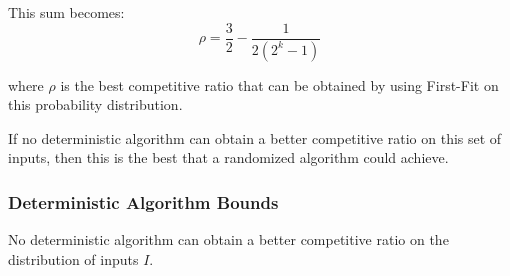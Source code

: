 This sum becomes:
\begin{equation*}
\rho = \frac{3}{2} - \frac{1}{2(2^k-1)}
\end{equation*}

where $\rho$ is the best competitive ratio that can be obtained by using First-Fit on this probability distribution. 

If no deterministic algorithm can obtain a better competitive ratio on this set of inputs, then this is the best that a randomized algorithm could achieve.
\subsubsection{Deterministic Algorithm Bounds}
\begin{theorem}
	No deterministic algorithm can obtain a better competitive ratio on the distribution of inputs $I$.
\end{theorem}
